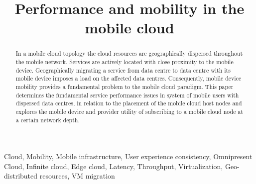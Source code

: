 \documentclass[conference]{IEEEtran}
\newcommand{\xcloud}{mobile cloud}
\newcommand{\ue}{mobile device}
\newcommand{\dc}{data centre}
\newcommand{\dcs}{data centres}
\begin{document}
\title{Performance and mobility in the \xcloud}

\author{
\and
{}
}

\maketitle

\begin{abstract}
In a \xcloud{} topology the cloud resources are geographically dispersed throughout the mobile network. Services are actively located with close proximity to the \ue. Geographically migrating a service from \dc{} to \dc{} with its \ue{} imposes a load on the affected \dcs. Consequently, \ue{} mobility provides a fundamental problem to the \xcloud{} paradigm. This paper determines the fundamental service performance issues in system of mobile users with dispersed \dcs{}, in relation to the placement of the \xcloud{} host nodes and explores the \ue{} and provider utility of subscribing to a \xcloud{} node at a certain network depth.
\end{abstract}

\begin{keywords} 
Cloud, Mobility, Mobile infrastructure, User experience consistency, Omnipresent Cloud, Infinite cloud, Edge cloud, Latency, Throughput, Virtualization, Geo-distributed resources, VM migration
\end{keywords} 

\IEEEpeerreviewmaketitle






\end{document}
